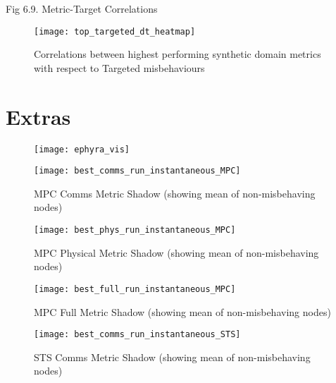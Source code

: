 \documentclass[aspectratio=43]{beamer}
\begin{document}
\begin{frame}{Fig 6.9. Metric-Target Correlations}
	\begin{figure}
		\centering
		\texttt{[image: top\_targeted\_dt\_heatmap]}
		\caption{Correlations between highest performing synthetic domain metrics with respect to Targeted misbehaviours}
		\label{fig:top_targeted_dt_heatmap}
	\end{figure}
\end{frame}

\section{Extras}

\begin{frame}
	\begin{figure}
		\texttt{[image: ephyra\_vis]}
	\end{figure}
\end{frame}



\begin{frame}\begin{figure}[h]
	\centering
	\texttt{[image: best\_comms\_run\_instantaneous\_MPC]}
	\caption{MPC Comms Metric Shadow (showing mean of non-misbehaving nodes)}
	\label{fig:comms_instantaneous_mpc}
\end{figure}\end{frame}

\begin{frame}\begin{figure}[h]
	\centering
	\texttt{[image: best\_phys\_run\_instantaneous\_MPC]}
	\caption{MPC Physical Metric Shadow (showing mean of non-misbehaving nodes)}
	\label{fig:phys_instantaneous_mpc}
\end{figure}\end{frame}

\begin{frame}\begin{figure}[h]
	\centering
	\texttt{[image: best\_full\_run\_instantaneous\_MPC]}
	\caption{MPC Full Metric Shadow (showing mean of non-misbehaving nodes)}
	\label{fig:full_instantaneous_mpc}
\end{figure}\end{frame}


\begin{frame}\begin{figure}[h]
	\centering
	\texttt{[image: best\_comms\_run\_instantaneous\_STS]}
	\caption{STS Comms Metric Shadow (showing mean of non-misbehaving nodes)}
	\label{fig:comms_instantaneous_sts}
\end{figure}\end{frame}
\end{document}
